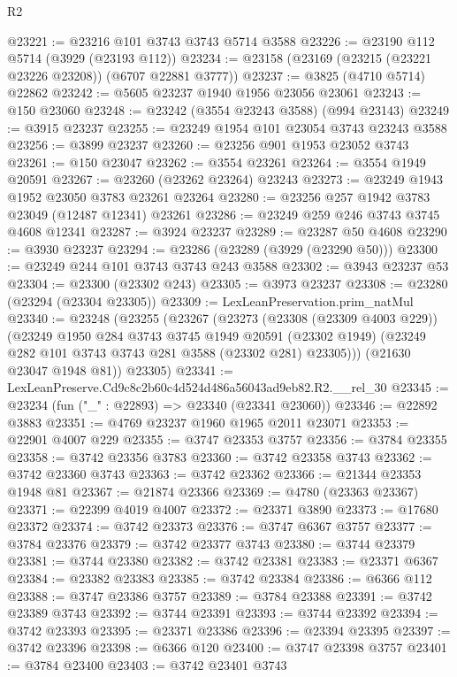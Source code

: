 \begin{lexlean}{R2}
\begin{coremodule}
@23221 := @23216 @101 @3743 @3743 @5714 @3588
@23226 := @23190 @112 @5714 (@3929 (@23193 @112))
@23234 := @23158 (@23169 (@23215 (@23221 @23226 @23208)) (@6707 @22881 @3777))
@23237 := @3825 (@4710 @5714) @22862
@23242 := @5605 @23237 @1940 @1956 @23056 @23061
@23243 := @150 @23060
@23248 := @23242 (@3554 @23243 @3588) (@994 @23143)
@23249 := @3915 @23237
@23255 := @23249 @1954 @101 @23054 @3743 @23243 @3588
@23256 := @3899 @23237
@23260 := @23256 @901 @1953 @23052 @3743
@23261 := @150 @23047
@23262 := @3554 @23261
@23264 := @3554 @1949 @20591
@23267 := @23260 (@23262 @23264) @23243
@23273 := @23249 @1943 @1952 @23050 @3783 @23261 @23264
@23280 := @23256 @257 @1942 @3783 @23049 (@12487 @12341) @23261
@23286 := @23249 @259 @246 @3743 @3745 @4608 @12341
@23287 := @3924 @23237
@23289 := @23287 @50 @4608
@23290 := @3930 @23237
@23294 := @23286 (@23289 (@3929 (@23290 @50)))
@23300 := @23249 @244 @101 @3743 @3743 @243 @3588
@23302 := @3943 @23237 @53
@23304 := @23300 (@23302 @243)
@23305 := @3973 @23237
@23308 := @23280 (@23294 (@23304 @23305))
@23309 := LexLeanPreservation.prim_natMul
@23340 := @23248
    (@23255
      (@23267
        (@23273
          (@23308 (@23309 @4003 @229))
          (@23249
            @1950
            @284
            @3743
            @3745
            @1949
            @20591
            (@23302 @1949)
            (@23249 @282 @101 @3743 @3743 @281 @3588 (@23302 @281) @23305)))
        (@21630 @23047 @1948 @81))
      @23305)
@23341 := LexLeanPreserve.Cd9c8c2b60c4d524d486a56043ad9eb82.R2.__rel_30
@23345 := @23234 (fun ("_" : @22893) => @23340 (@23341 @23060))
@23346 := @22892 @3883
@23351 := @4769 @23237 @1960 @1965 @2011 @23071
@23353 := @22901 @4007 @229
@23355 := @3747 @23353 @3757
@23356 := @3784 @23355
@23358 := @3742 @23356 @3783
@23360 := @3742 @23358 @3743
@23362 := @3742 @23360 @3743
@23363 := @3742 @23362
@23366 := @21344 @23353 @1948 @81
@23367 := @21874 @23366
@23369 := @4780 (@23363 @23367)
@23371 := @22399 @4019 @4007
@23372 := @23371 @3890
@23373 := @17680 @23372
@23374 := @3742 @23373
@23376 := @3747 @6367 @3757
@23377 := @3784 @23376
@23379 := @3742 @23377 @3743
@23380 := @3744 @23379
@23381 := @3744 @23380
@23382 := @3742 @23381
@23383 := @23371 @6367
@23384 := @23382 @23383
@23385 := @3742 @23384
@23386 := @6366 @112
@23388 := @3747 @23386 @3757
@23389 := @3784 @23388
@23391 := @3742 @23389 @3743
@23392 := @3744 @23391
@23393 := @3744 @23392
@23394 := @3742 @23393
@23395 := @23371 @23386
@23396 := @23394 @23395
@23397 := @3742 @23396
@23398 := @6366 @120
@23400 := @3747 @23398 @3757
@23401 := @3784 @23400
@23403 := @3742 @23401 @3743

\end{coremodule}
\end{lexlean}
